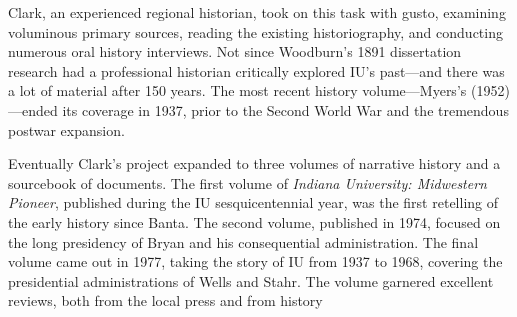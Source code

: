 \documentclass[
  american,
  letterpaper,
]{scrreprt}
\begin{document}
Clark, an experienced regional historian, took on this task with gusto,
examining voluminous primary sources, reading the existing
historiography, and conducting numerous oral history interviews. Not
since Woodburn's 1891 dissertation research had a professional historian
critically explored IU's past---and there was a lot of material after
150 years. The most recent history volume---Myers's (1952)---ended its
coverage in 1937, prior to the Second World War and the tremendous
postwar expansion.

Eventually Clark's project expanded to three volumes of narrative
history and a sourcebook of documents. The first volume of \emph{Indiana
University: Midwestern Pioneer}, published during the IU
sesquicentennial year, was the first retelling of the early history
since Banta. The second volume, published in 1974, focused on the long
presidency of Bryan and his consequential administration. The final
volume came out in 1977, taking the story of IU from 1937 to 1968,
covering the presidential administrations of Wells and Stahr. The volume
garnered excellent reviews, both from the local press and from history
\end{document}
